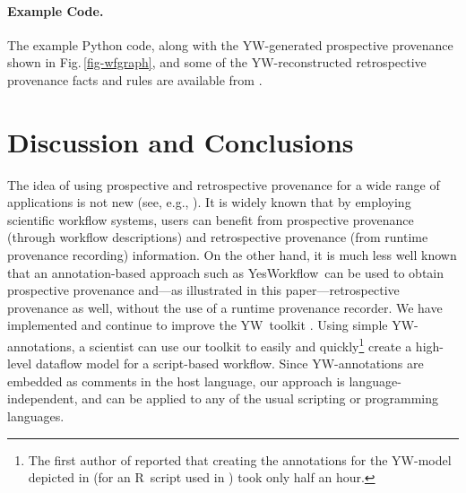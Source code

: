 \documentclass[letterpaper,twocolumn,10pt]{article}
\newcommand{\figref}[1]{Fig.\,\ref{#1}}
\newcommand{\YW}{\textsf{YesWorkflow}}
\newcommand{\yw}{\textsf{YW}}
\newcommand{\R}{\textsf{R}}
\begin{document}
\paragraph{Example Code.}
The example Python code, along with the \yw-generated prospective
provenance shown in \figref{fig-wfgraph}, and some of the
\yw-reconstructed retrospective provenance facts and rules are
available from \cite{mcphillips2015example}.

\section{Discussion and Conclusions} 
\label{sec:discussion}

The idea of using prospective and retrospective provenance for a wide
range of applications is not new (see, e.g.,
\cite{zhao2006applying,missier2008data,frew2008automatic}).  It is
widely known that by employing scientific workflow systems, users can
benefit from prospective provenance (through workflow descriptions)
and retrospective provenance (from runtime provenance recording)
information. On the other hand, it is much less well known that an
annotation-based approach such as \YW\ can be used to obtain
prospective provenance and---as illustrated in this
paper---retrospective provenance as well, without the use of a runtime
provenance recorder.  We have implemented and continue to improve the
\yw\ toolkit \cite{mcphillips2015ywIJDC,yw-website}. Using simple
\yw-annotations, a scientist can use our toolkit to easily and
quickly\footnote{The first author of \cite{bocinsky2014} reported that
  creating the annotations for the \yw-model depicted in
  \cite{mcphillips2015ywIJDC} (for an \R\ script used in
  \cite{bocinsky2014}) took only half an hour.}  create a high-level
dataflow model for a script-based workflow.  Since \yw-annotations are
embedded as comments in the host language, our approach is
language-independent, and can be applied to any of the usual scripting
or programming languages.
\end{document}

